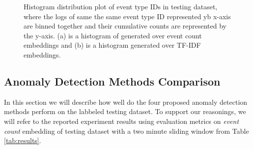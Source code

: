\begin{figure}[h]%
    \centering
    \qquad
    \caption{Histogram distribution plot of event type IDs in testing dataset, where the logs of same the same event type ID represented yb x-axis are binned together and their cumulative counts are represented by the y-axis. (a) is a histogram of generated over event count embeddings and (b) is a histogram generated over TF-IDF embeddings.}%
    \label{fig:histogram-event-types}%
\end{figure}


\subsection{Anomaly Detection Methods Comparison}
In this section we will describe how well do the four proposed anomaly detection methods perform on the labbeled testing dataset. To support our reasonings, we will refer to the reported experiment results using evaluation metrics on \textit{event count} embedding of testing dataset with a two minute sliding window from Table \ref{tab:results}. 

